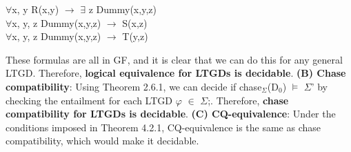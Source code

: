 \documentclass[11pt, a4paper, dvipsnames]{article}
\begin{document}
\begin{center}
$\forall$x, y R(x,y) $\rightarrow$ $\exists$ z Dummy(x,y,z)\\
$\forall$x, y, z Dummy(x,y,z) $\rightarrow$ S(x,z)\\
$\forall$x, y, z Dummy(x,y,z) $\rightarrow$ T(y,z)
\end{center}
These formulas are all in GF, and it is clear that we can do this for any general LTGD.\newline
Therefore, \textbf{logical equivalence for LTGDs is decidable}. \newline
\textbf{(B) Chase compatibility}:
Using Theorem 2.6.1, we can decide if chase$_{\Sigma}$(D$_{0}$) $\vDash$ $\Sigma$' by checking the entailment for each LTGD $\varphi$ $\in$ $\Sigma$;. Therefore, \textbf{chase compatibility for LTGDs is decidable}.\newline
\textbf{(C) CQ-equivalence}: Under the conditions imposed in Theorem 4.2.1, CQ-equivalence is the same as chase compatibility, which would make it decidable. 
\end{document}
